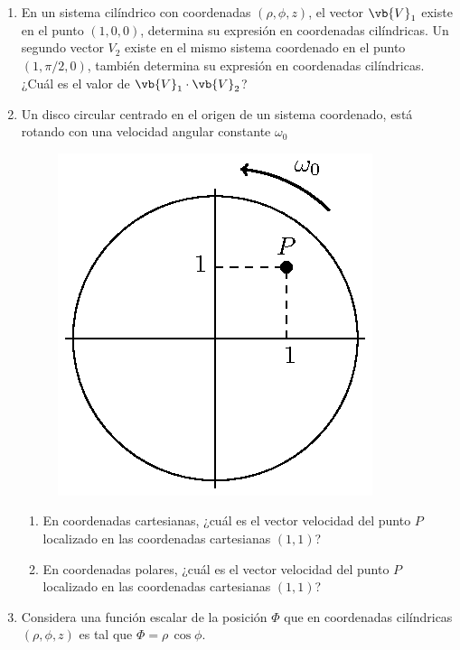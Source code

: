 \begin{enumerate}
\item En un sistema cilíndrico con coordenadas $(\rho, \phi, z)$, el vector $\vb{V}_{1}$ existe en el punto $(1, 0, 0)$, determina su expresión en coordenadas cilíndricas. Un segundo vector $V_{2}$ existe en el mismo sistema coordenado en el punto $(1, \pi/2, 0)$, también determina su expresión en coordenadas cilíndricas. ¿Cuál es el valor de $\vb{V}_{1} \cdot \vb{V}_{2}$?
\item Un disco circular centrado en el origen de un sistema coordenado, está rotando con una velocidad angular constante $\omega_{0}$
\begin{figure}[H]
    \centering
    \includegraphics[scale=1]{Imagenes/Ejercicio_Disco_Rotando_01.eps}
\end{figure}
\begin{enumerate}[label=\alph*)]
\item En coordenadas cartesianas, ¿cuál es el vector velocidad del punto $P$ localizado en las coordenadas cartesianas $(1, 1)$?
\item En coordenadas polares, ¿cuál es el vector velocidad del punto $P$ localizado en las coordenadas cartesianas $(1, 1)$?
\end{enumerate}
\item Considera una función escalar de la posición $\Phi$ que en coordenadas cilíndricas $(\rho, \phi, z)$ es tal que $\Phi = \rho \, \cos \phi$.
\begin{enumerate}[label=\roman*)]

\end{enumerate}
\end{enumerate}
